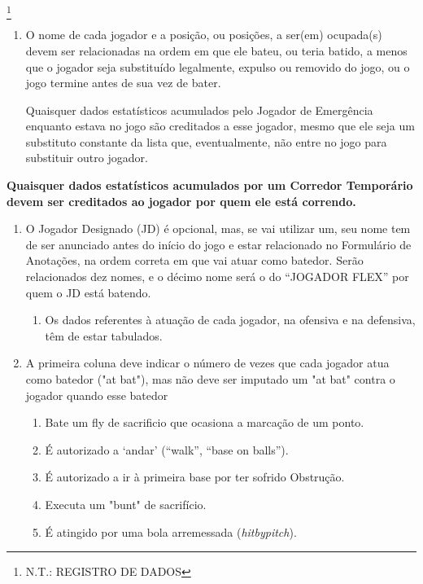 \footnote{N.T.: REGISTRO DE DADOS }
\begin{multicols}{2} 
	
	\begin{enumerate}[label=\alph*)]
		\item O nome de cada jogador e a posição, ou posições, a ser(em) ocupada(s) devem ser relacionadas na ordem em que ele bateu, ou teria batido, a menos que o jogador seja substituído legalmente, expulso ou removido do jogo, ou o jogo termine antes de sua vez de bater.
		
		Quaisquer dados estatísticos acumulados pelo Jogador de Emergência enquanto estava no jogo são creditados a esse jogador, mesmo que ele seja um substituto constante da lista que, eventualmente, não entre no jogo para substituir outro jogador. 
	\end{enumerate}
	\textbf{Quaisquer dados estatísticos acumulados por um Corredor Temporário devem ser creditados ao jogador por quem ele está correndo.} 
	\begin{enumerate}[label= \arabic*)]
		\item  O Jogador Designado (JD) é opcional, mas, se vai utilizar um, seu nome tem de ser anunciado antes do início do jogo e estar relacionado no Formulário de Anotações, na ordem correta em que vai atuar como batedor. Serão relacionados dez nomes, e o décimo nome será o do “JOGADOR FLEX” por quem o JD está batendo. 
		\begin{enumerate}[label=(\alph*)]
			\item Os dados referentes à atuação de cada jogador, na ofensiva e na defensiva, têm de 
			estar tabulados. 
		\end{enumerate}
		\item A primeira coluna deve indicar o número de vezes que cada jogador atua como batedor ("at bat"), mas não deve ser imputado um "at bat" contra o jogador quando esse batedor 
		\begin{enumerate}[label= (\alph*)]
			\item Bate um \gls{fly de sacrificio} que ocasiona a marcação de um ponto. 
			\item É autorizado a ‘andar’ (“walk”, “base on balls”). 
			\item É autorizado a ir à primeira base por ter sofrido Obstrução. 
			\item Executa um "bunt" de sacrifício. 
			\item É atingido por uma bola arremessada (\textit{hitbypitch}). 
		\end{enumerate}

\end{enumerate}
\end{multicols}
